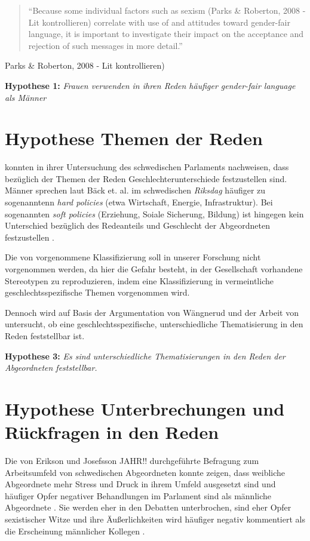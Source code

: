 \documentclass[12pt, 
    twoside=false, 
    bibliography=totoc, 
    numbers=endperiod, 
    headings=normal, 
    toc=chapterentrydotfill
    ]{scrbook}
\begin{document}
\begin{quote}
 \enquote {Because some individual factors such as sexism (Parks \& Roberton, 2008 - Lit kontrollieren) correlate with use of and attitudes toward gender-fair language, it is important to investigate their impact on the acceptance and rejection of such messages in more detail.} \parencite[556]{koeser_2014}
\end{quote} Parks \& Roberton, 2008 - Lit kontrollieren) 




\textbf{Hypothese 1:} \emph{Frauen verwenden in ihren Reden häufiger gender-fair language als Männer}


\section{Hypothese Themen der Reden}


\textcite{back_2014} konnten in ihrer Untersuchung des schwedischen Parlaments nachweisen, dass bezüglich der Themen der Reden Geschlechterunterschiede festzustellen sind. Männer sprechen laut Bäck et. al. im schwedischen \emph{Riksdag} häufiger zu sogenanntenn \emph{hard policies} (etwa Wirtschaft, Energie, Infrastruktur). Bei sogenannten \emph{soft policies} (Erziehung, Soiale Sicherung, Bildung) ist hingegen kein Unterschied bezüglich des Redeanteils und Geschlecht der Abgeordneten festzustellen \parencite[514f.]{back_2014}.

Die von \textcite{back_2014} vorgenommene Klassifizierung soll in unserer Forschung nicht vorgenommen werden, da hier die Gefahr besteht, in der Gesellschaft vorhandene Stereotypen zu reproduzieren, indem eine Klassifizierung in vermeintliche geschlechtsspezifische Themen vorgenommen wird.

Dennoch wird auf Basis der Argumentation von Wängnerud \parencites*{wangnerud_2000}{wangnerud_2009} und der Arbeit von \textcite{back_2014} untersucht, ob eine geschlechtsspezifische, unterschiedliche Thematisierung in den Reden feststellbar ist. 

\textbf{Hypothese 3:} \emph{Es sind unterschiedliche Thematisierungen in den Reden der Abgeordneten feststellbar.}


\section{Hypothese Unterbrechungen und Rückfragen in den Reden}


Die von Erikson und Josefsson JAHR!! durchgeführte Befragung zum Arbeitsumfeld von schwedischen Abgeordneten konnte zeigen, dass weibliche Abgeordnete mehr Stress und Druck in ihrem Umfeld ausgesetzt sind und häufiger Opfer negativer Behandlungen im Parlament sind als männliche Abgeordnete \parencite{erikson_2018}. Sie werden eher in den Debatten unterbrochen, sind eher Opfer sexistischer Witze und ihre Äußerlichkeiten wird häufiger negativ kommentiert als die Erscheinung männlicher Kollegen \parencite[13]{erikson_2018}.
\end{document}
